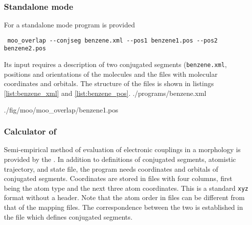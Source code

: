 \subsubsection{Standalone mode}
For a standalone mode program \overlap is provided 
\begin{verbatim}
 moo_overlap --conjseg benzene.xml --pos1 benzene1.pos --pos2 benzene2.pos
\end{verbatim}
Its input requires a description of two conjugated segments (\texttt{benzene.xml}, positions and orientations of the molecules and the files with molecular coordinates and orbitals. The structure of the files is shown in listings \ref{list:benzene_xml} and  \ref{list:benzene_pos}.
\vskip 0.1cm
 {./programs/benzene.xml}

\vskip 0.1cm

 {./fig/moo/moo_overlap/benzene1.pos}


\subsubsection{Calculator of \votcactp}
Semi-empirical method of evaluation of electronic couplings in a morphology is provided by the \integrals \calculator. In addition to definitions of conjugated segments, atomistic trajectory, and state file, the program needs coordinates and orbitals of conjugated segments. Coordinates are stored in \xyz files with four columns, first being the atom type and the next three atom coordinates. This is a standard \texttt{xyz} format without a header. Note that the atom order in \xyz files can be different from that of the mapping files. The correspondence between the two is established in the file which defines conjugated segments.
